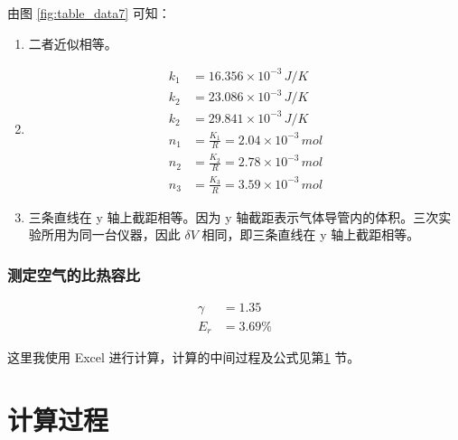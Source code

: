 \documentclass[12pt]{article}
\begin{document}
由图 \ref{fig:table_data7} 可知：

\begin{enumerate}
    \item 二者近似相等。
    \item 
        \begin{align*}
            k_1 &= 16.356 \times 10^{-3} \, \text{$J/K$} \\
            k_2 &= 23.086 \times 10^{-3} \, \text{$J/K$} \\
            k_2 &= 29.841 \times 10^{-3} \, \text{$J/K$} \\
            n_1 &= \frac{K_1}{R} = 2.04 \times 10^{-3} \, \text{$mol$} \\
            n_2 &= \frac{K_2}{R} = 2.78 \times 10^{-3} \, \text{$mol$} \\
            n_3 &= \frac{K_3}{R} = 3.59 \times 10^{-3} \, \text{$mol$}
        \end{align*}
    \item 三条直线在 y 轴上截距相等。因为 y 轴截距表示气体导管内的体积。三次实验所用为同一台仪器，因此 $\delta V $ 相同，即三条直线在 y 轴上截距相等。
\end{enumerate}

\subsubsection{\normalfont 测定空气的比热容比}

\begin{align*}
    \gamma &= 1.35\\
    E_r &= 3.69\%
\end{align*}


这里我使用 Excel 进行计算，计算的中间过程及公式见第\ref{sec:calculation_process} 节。

\section{\normalfont 计算过程}
\label{sec:calculation_process}




\end{document}
